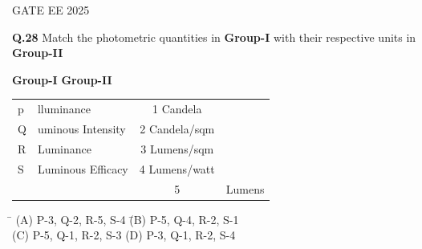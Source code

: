 \documentclass[journal,12pt,onecolumn]{IEEEtran}
\theoremstyle{remark}
\begin{document}
GATE EE 2025
 

\noindent \textbf{Q.28} \quad Match the photometric quantities in \textbf{Group-I} with their respective units in \textbf{Group-II}

\vspace{1cm}


\hspace{3cm}  \textbf{Group-I}\hspace{8cm} \textbf{Group-II} \\
\vspace{0.15cm}
\begin{tabular}{llcl}
\vspace{0.15cm}
\hspace{2cm} p & lluminance  & \hspace{6cm} 1   Candela \\
\vspace{0.15cm}
\hspace{2cm} Q & uminous Intensity  & \hspace{6cm} 2  Candela/sqm \\ \vspace{0.15cm}
\hspace{2cm} R & Luminance & \hspace{6cm} 3  Lumens/sqm \\ \vspace{0.15cm}
\hspace{2cm} S & Luminous Efficacy & \hspace{6cm} 4  Lumens/watt \\ \vspace{0.15cm}
\vspace{0.15cm} 
  &                         &\hspace{6cm} 5 & Lumens
\end{tabular}

\vspace{0.5cm}





\begin{flushleft}
\begin{tabbing}
\hspace{5cm} \= \kill
\hspace{2cm}(A) P-3, Q-2, R-5, S-4 \hspace{4cm} \= (B) P-5, Q-4, R-2, S-1 \\
\hspace{2cm}(C) P-5, Q-1, R-2, S-3 \> (D) P-3, Q-1, R-2, S-4 \\
\end{tabbing}
\end{flushleft}
\end{document}
